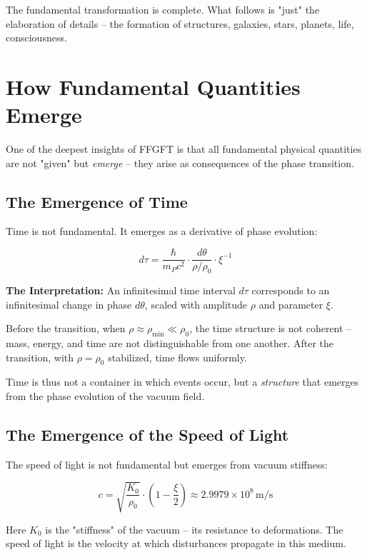 	The fundamental transformation is complete. What follows is "just" the elaboration of details -- the formation of structures, galaxies, stars, planets, life, consciousness.
	
	\section{How Fundamental Quantities Emerge}
	
	One of the deepest insights of FFGFT is that all fundamental physical quantities are not "given" but \textit{emerge} -- they arise as consequences of the phase transition.
	
	\subsection{The Emergence of Time}
	
	Time is not fundamental. It emerges as a derivative of phase evolution:
	
	\begin{equation}
		d\tau = \frac{\hbar}{m_P c^2} \cdot \frac{d\theta}{\rho/\rho_0} \cdot \xi^{-1}
	\end{equation}
	
	\textbf{The Interpretation:} An infinitesimal time interval $d\tau$ corresponds to an infinitesimal change in phase $d\theta$, scaled with amplitude $\rho$ and parameter $\xi$.
	
	Before the transition, when $\rho \approx \rho_{\min} \ll \rho_0$, the time structure is not coherent -- mass, energy, and time are not distinguishable from one another. After the transition, with $\rho = \rho_0$ stabilized, time flows uniformly.
	
	Time is thus not a container in which events occur, but a \textit{structure} that emerges from the phase evolution of the vacuum field.
	
	\subsection{The Emergence of the Speed of Light}
	
	The speed of light is not fundamental but emerges from vacuum stiffness:
	
	\begin{equation}
		c = \sqrt{\frac{K_0}{\rho_0}} \cdot \left(1 - \frac{\xi}{2}\right) \approx 2.9979 \times 10^8 \, \text{m/s}
	\end{equation}
	
	Here $K_0$ is the "stiffness" of the vacuum -- its resistance to deformations. The speed of light is the velocity at which disturbances propagate in this medium.
	
